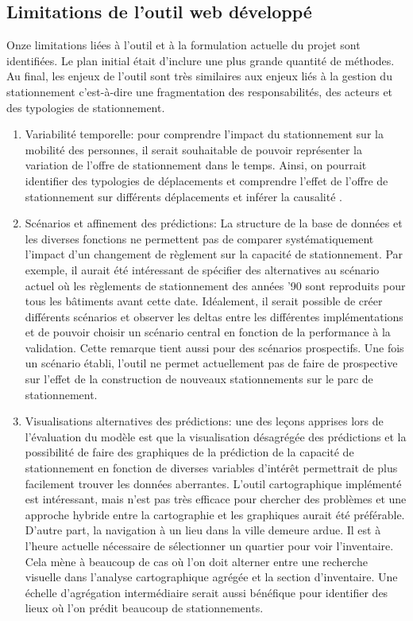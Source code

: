    \subsection{Limitations de l'outil web développé}
        Onze limitations liées à l'outil et à la formulation actuelle du projet sont identifiées. Le plan initial était d'inclure une plus grande quantité de méthodes. Au final, les enjeux de l'outil sont très similaires aux enjeux liés à la gestion du stationnement c'est-à-dire une fragmentation des responsabilités, des acteurs et des typologies de stationnement.
        \begin{enumerate}
            \item Variabilité temporelle: pour comprendre l'impact du stationnement sur la mobilité des personnes, il serait souhaitable de pouvoir représenter la variation de l'offre de stationnement dans le temps. Ainsi, on pourrait identifier des typologies de déplacements et comprendre l'effet de l'offre de stationnement sur différents déplacements et inférer la causalité \parencite{deschaintres_measuring_2021}.
            \item Scénarios et affinement des prédictions: La structure de la base de données et les diverses fonctions ne permettent pas de comparer systématiquement l'impact d'un changement de règlement sur la capacité de stationnement. Par exemple, il aurait été intéressant de spécifier des alternatives au scénario actuel où les règlements de stationnement des années '90 sont reproduits pour tous les bâtiments avant cette date. Idéalement, il serait possible de créer différents scénarios et observer les deltas entre les différentes implémentations et de pouvoir choisir un scénario central en fonction de la performance à la validation. Cette remarque tient aussi pour des scénarios prospectifs. Une fois un scénario établi, l'outil ne permet actuellement pas de faire de prospective sur l'effet de la construction de nouveaux stationnements sur le parc de stationnement.
            \item  Visualisations alternatives des prédictions: une des leçons apprises lors de l'évaluation du modèle est que la visualisation désagrégée des prédictions et la possibilité de faire des graphiques de la prédiction de la capacité de stationnement en fonction de diverses variables d'intérêt permettrait de plus facilement trouver les données aberrantes. L'outil cartographique implémenté est intéressant, mais n'est pas très efficace pour chercher des problèmes et une approche hybride entre la cartographie et les graphiques aurait été préférable. D'autre part, la navigation à un lieu dans la ville demeure ardue. Il est à l'heure actuelle nécessaire de sélectionner un quartier pour voir l'inventaire. Cela mène à beaucoup de cas où l'on doit alterner entre une recherche visuelle dans l'analyse cartographique agrégée et la section d'inventaire. Une échelle d'agrégation intermédiaire serait aussi bénéfique pour identifier des lieux où l'on prédit beaucoup de stationnements.

\end{enumerate}
